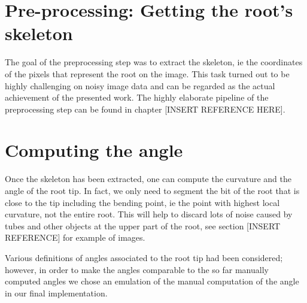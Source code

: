 \section{Pre-processing: Getting the root's skeleton}

The goal of the preprocessing step was to extract the skeleton, ie the coordinates of the pixels that represent the root on the image.
This task turned out to be highly challenging on noisy image data and can be regarded as the actual achievement of the presented work. The highly elaborate pipeline of the preprocessing step can be found in chapter [INSERT REFERENCE HERE].




\section{Computing the angle}

Once the skeleton has been extracted, one can compute the curvature and the angle of the root tip. 
In fact, we only need to segment the bit of the root that is close to the tip including the bending point, ie the point with highest local curvature, not the entire root. This will help to discard lots of noise caused by tubes and other objects at the upper part of the root, see section [INSERT REFERENCE] for example of images.

Various definitions of angles associated to the root tip had been considered; however, in order to make the angles comparable to the so far manually computed angles we chose an emulation of the manual computation of the angle in our final implementation. 



